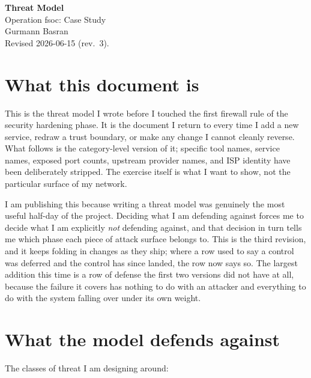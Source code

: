 \documentclass[12pt]{article}
\begin{document}
\begin{center}
{\LARGE\textbf{Threat Model}}\\[4pt]
{\large Operation fsoc: Case Study}\\[6pt]
Gurmann Basran\\
\small Revised 2026-06-15 (rev.\ 3).
\end{center}

\section{What this document is}

This is the threat model I wrote before I touched the first firewall rule of the security hardening phase. It is the document I return to every time I add a new service, redraw a trust boundary, or make any change I cannot cleanly reverse. What follows is the category-level version of it; specific tool names, service names, exposed port counts, upstream provider names, and ISP identity have been deliberately stripped. The exercise itself is what I want to show, not the particular surface of my network.

I am publishing this because writing a threat model was genuinely the most useful half-day of the project. Deciding what I am defending against forces me to decide what I am explicitly \emph{not} defending against, and that decision in turn tells me which phase each piece of attack surface belongs to. This is the third revision, and it keeps folding in changes as they ship; where a row used to say a control was deferred and the control has since landed, the row now says so. The largest addition this time is a row of defense the first two versions did not have at all, because the failure it covers has nothing to do with an attacker and everything to do with the system falling over under its own weight.

\section{What the model defends against}

The classes of threat I am designing around:
\end{document}
